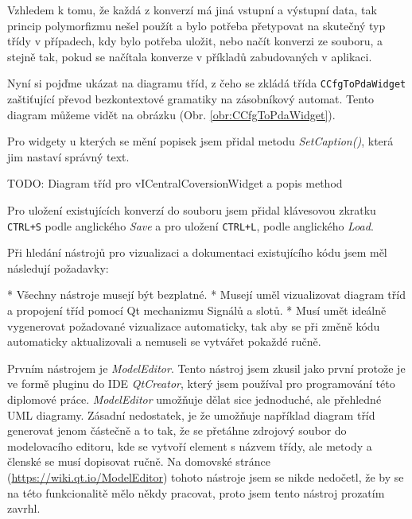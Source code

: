 Vzhledem k tomu, že každá z konverzí má jiná vstupní a výstupní data, tak princip polymorfizmu nešel použít a bylo potřeba přetypovat na skutečný typ třídy v případech, kdy bylo potřeba uložit, nebo načít konverzi ze souboru, a stejně tak, pokud se načítala konverze v příkladů zabudovaných v aplikaci.


Nyní si pojďme ukázat na diagramu tříd, z čeho se zkládá třída \texttt{CCfgToPdaWidget} zaštiťující převod bezkontextové gramatiky na zásobníkový automat. Tento diagram můžeme vidět na obrázku (Obr. \ref{obr:CCfgToPdaWidget}).


Pro widgety u kterých se mění popisek jsem přidal metodu \textit{SetCaption()}, která jim nastaví správný text.

TODO: Diagram tříd pro vICentralCoversionWidget a popis method 


Pro uložení existujících konverzí do souboru jsem přidal klávesovou zkratku \texttt{CTRL+S} podle anglického \textit{Save} a pro uložení \texttt{CTRL+L}, podle anglického \textit{Load}.


Při hledání nástrojů pro vizualizaci a dokumentaci existujícího kódu jsem měl následují požadavky:

* Všechny nástroje musejí být bezplatné.
* Musejí uměl vizualizovat diagram tříd a propojení tříd pomocí Qt mechanizmu Signálů a slotů.
* Musí umět ideálně vygenerovat požadované vizualizace automaticky, tak aby se při změně kódu automaticky aktualizovali a nemuseli se vytvářet pokaždé ručně.


Prvním nástrojem je \textit{ModelEditor}. Tento nástroj jsem zkusil jako první protože je ve formě pluginu do IDE \textit{QtCreator}, který jsem používal pro programování této diplomové práce. \textit{ModelEditor} umožňuje dělat sice jednoduché, ale přehledné UML diagramy. Zásadní nedostatek, je že umožňuje například diagram tříd generovat jenom částečně a to tak, že se přetáhne zdrojový soubor do modelovacího editoru, kde se vytvoří element s názvem třídy, ale metody a členské se musí dopisovat ručně. Na domovské stránce (\url{https://wiki.qt.io/ModelEditor}) tohoto nástroje jsem se nikde nedočetl, že by se na této funkcionalitě mělo někdy pracovat, proto jsem tento nástroj prozatím zavrhl.


